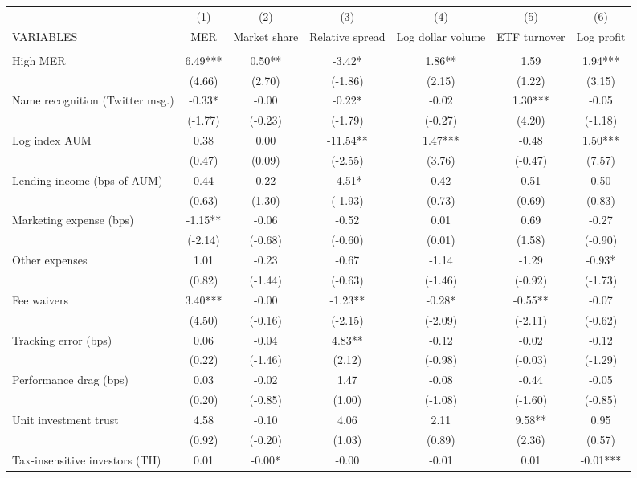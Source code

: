 \documentclass[]{article}
\begin{document}
\begin{tabular}{lcccccc} \hline
 & (1) & (2) & (3) & (4) & (5) & (6) \\
VARIABLES & MER & Market share & Relative spread & Log dollar volume & ETF turnover & Log profit \\ \hline
 &  &  &  &  &  &  \\
High MER & 6.49*** & 0.50** & -3.42* & 1.86** & 1.59 & 1.94*** \\
 & (4.66) & (2.70) & (-1.86) & (2.15) & (1.22) & (3.15) \\
Name recognition (Twitter msg.) & -0.33* & -0.00 & -0.22* & -0.02 & 1.30*** & -0.05 \\
 & (-1.77) & (-0.23) & (-1.79) & (-0.27) & (4.20) & (-1.18) \\
Log index AUM & 0.38 & 0.00 & -11.54** & 1.47*** & -0.48 & 1.50*** \\
 & (0.47) & (0.09) & (-2.55) & (3.76) & (-0.47) & (7.57) \\
Lending income (bps of AUM) & 0.44 & 0.22 & -4.51* & 0.42 & 0.51 & 0.50 \\
 & (0.63) & (1.30) & (-1.93) & (0.73) & (0.69) & (0.83) \\
Marketing expense (bps) & -1.15** & -0.06 & -0.52 & 0.01 & 0.69 & -0.27 \\
 & (-2.14) & (-0.68) & (-0.60) & (0.01) & (1.58) & (-0.90) \\
Other expenses & 1.01 & -0.23 & -0.67 & -1.14 & -1.29 & -0.93* \\
 & (0.82) & (-1.44) & (-0.63) & (-1.46) & (-0.92) & (-1.73) \\
Fee waivers & 3.40*** & -0.00 & -1.23** & -0.28* & -0.55** & -0.07 \\
 & (4.50) & (-0.16) & (-2.15) & (-2.09) & (-2.11) & (-0.62) \\
Tracking error (bps) & 0.06 & -0.04 & 4.83** & -0.12 & -0.02 & -0.12 \\
 & (0.22) & (-1.46) & (2.12) & (-0.98) & (-0.03) & (-1.29) \\
Performance drag (bps) & 0.03 & -0.02 & 1.47 & -0.08 & -0.44 & -0.05 \\
 & (0.20) & (-0.85) & (1.00) & (-1.08) & (-1.60) & (-0.85) \\
Unit investment trust & 4.58 & -0.10 & 4.06 & 2.11 & 9.58** & 0.95 \\
 & (0.92) & (-0.20) & (1.03) & (0.89) & (2.36) & (0.57) \\
Tax-insensitive investors (TII) & 0.01 & -0.00* & -0.00 & -0.01 & 0.01 & -0.01*** \\

\end{tabular}
\end{document}
